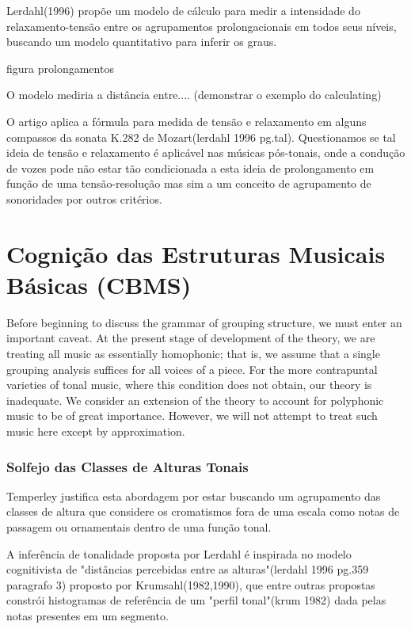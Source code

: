 \documentclass[
	12pt,				%
	openright,			%
	twoside,			%
	a4paper,			%
	english,			%
	french,				%
	spanish,			%
	brazil				%
	]{abntex2}
\begin{document}
Lerdahl(1996) propõe um modelo de cálculo para medir a intensidade do relaxamento-tensão entre os agrupamentos prolongacionais em todos seus níveis, buscando um modelo quantitativo para inferir os graus.


figura prolongamentos


O modelo mediria a distância entre.... (demonstrar o exemplo do calculating)

O artigo aplica a fórmula para medida de tensão e relaxamento em alguns compassos da sonata K.282 de Mozart(lerdahl 1996 pg.tal). Questionamos se tal ideia de tensão e relaxamento é aplicável nas músicas pós-tonais, onde a condução de vozes pode não estar tão condicionada a esta ideia de prolongamento em função de uma tensão-resolução mas sim a um conceito de agrupamento de sonoridades por outros critérios. 


\section{Cognição das Estruturas Musicais Básicas (CBMS)}



\begin{citacao}
Before beginning to discuss the grammar of grouping structure, we must enter an important caveat. At the present stage of development of the theory, we are treating all music as essentially homophonic; that is, we assume that a single grouping analysis suffices for all voices of a piece. For the more contrapuntal varieties of tonal music, where this condition does not obtain, our theory is inadequate. We consider an extension of the theory to account for polyphonic music to be of great importance. However, we will not attempt to treat such music here except by approximation.\cite{lerdahl1983generative}
\end{citacao}



\subsubsection{Solfejo das Classes de Alturas Tonais}

Temperley justifica esta abordagem por estar buscando um agrupamento das classes de altura que considere os cromatismos fora de uma escala como notas de passagem ou ornamentais dentro de uma função tonal.

A inferência de tonalidade proposta por Lerdahl é inspirada no modelo cognitivista de "distâncias percebidas entre as alturas"(lerdahl 1996 pg.359 paragrafo 3) proposto por Krumsahl(1982,1990), que entre outras propostas constrói histogramas de referência de um "perfil tonal"(krum 1982) dada pelas notas presentes em um segmento.
\end{document}
